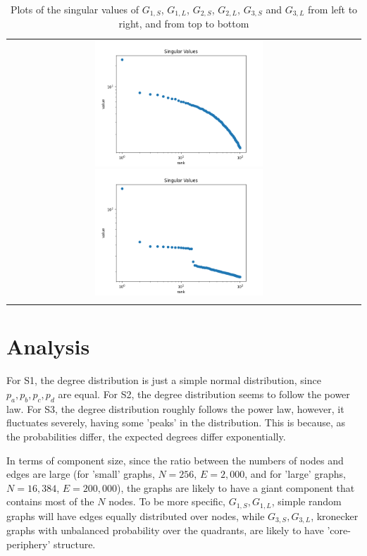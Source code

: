 \documentclass[12pt, letterpaper, twoside]{article}
\begin{document}
\begin{center}
\begin{longtable}{ c c }
        \includegraphics[width=0.5\textwidth]{3S_svd.png} \includegraphics[width=0.5\textwidth]{3L_svd.png} \\
    \caption{Plots of the singular values of $G_{1,S}$, $G_{1,L}$, $G_{2,S}$, $G_{2,L}$, $G_{3,S}$ and $G_{3,L}$ from left to right, and from top to bottom}
    \end{longtable}
    
    \end{center}

\section{Analysis}

For S1, the degree distribution is just a simple normal distribution, since $p_a,p_b,p_c,p_d$ are equal. For S2, the degree distribution seems to follow the power law.
For S3, the degree distribution roughly follows the power law, however, it fluctuates severely, having some 'peaks' in the distribution.
This is because, as the probabilities differ, the expected degrees differ exponentially.

In terms of component size, since the ratio between the numbers of nodes and edges are large (for 'small' graphs, $N=256$, $E=2,000$, and for 'large' graphs, $N=16,384$, $E=200,000$), the graphs are likely to have a giant component that contains most of the $N$ nodes.
To be more specific, $G_{1,S},G_{1,L}$, simple random graphs will have edges equally distributed over nodes, while $G_{3,S},G_{3,L}$, kronecker graphs with unbalanced probability over the quadrants, are likely to have 'core-periphery' structure.
\end{document}
